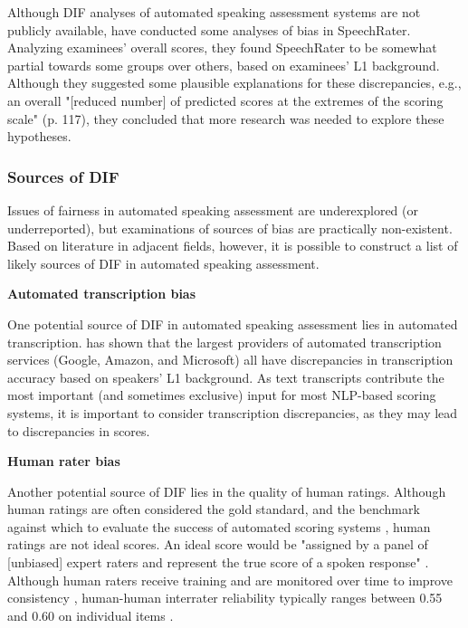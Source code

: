 \documentclass [PhD] {uclathes}
\begin{document}
Although DIF analyses of automated speaking assessment systems are not publicly available, \citet{wang2018monitoring} have conducted some analyses of bias in SpeechRater. Analyzing examinees’ overall scores, they found SpeechRater to be somewhat partial towards some groups over others, based on examinees’ L1 background. Although they suggested some plausible explanations for these discrepancies, e.g., an overall "[reduced number] of predicted scores at the extremes of the scoring scale" (p. 117), they concluded that more research was needed to explore these hypotheses.

\subsubsection{Sources of DIF}

Issues of fairness in automated speaking assessment are underexplored (or underreported), but examinations of sources of bias are practically non-existent. Based on literature in adjacent fields, however, it is possible to construct a list of likely sources of DIF in automated speaking assessment. 

\noindent \textbf{Automated transcription bias} \;

One potential source of DIF in automated speaking assessment lies in automated transcription. \citet{dichristofano2023} has shown that the largest providers of automated transcription services (Google, Amazon, and Microsoft) all have discrepancies in transcription accuracy based on speakers’ L1 background. As text transcripts contribute the most important (and sometimes exclusive) input for most NLP-based scoring systems, it is important to consider transcription discrepancies, as they may lead to discrepancies in scores.

\noindent \textbf{Human rater bias} \;

Another potential source of DIF lies in the quality of human ratings. Although human ratings are often considered the gold standard, and the benchmark against which to evaluate the success of automated scoring systems \citep{zhang2019assessing}, human ratings are not ideal scores. An ideal score would be "assigned by a panel of [unbiased] expert raters and represent the true score of a spoken response" \citep{zechner2019summary}. Although human raters receive training and are monitored over time to improve consistency \citep{engelhard2002monitoring}, human-human interrater reliability typically ranges between 0.55 and 0.60 on individual items \citep{zechner2019summary}. 
\end{document}
